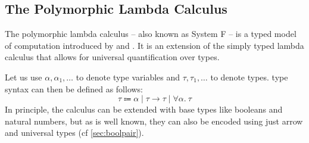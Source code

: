 \documentclass[12pt]{article}
\theoremstyle{plain}
\theoremstyle{definition}
\begin{document}
\subsection{The Polymorphic Lambda Calculus}

The polymorphic lambda calculus
-- also known as System F --
is a typed model of computation introduced by \citet{girard1972interpretation} and \citet{reynolds1974towards}.
It is an extension of the simply typed lambda calculus that allows for universal quantification over types.

Let us use $\alpha,\alpha_1,\dots$ to denote type variables and $\tau,\tau_1,\dots$ to denote types.
 type syntax can then be defined as follows:
\begin{equation*}
 \tau \Coloneqq  \alpha \mid \tau \to \tau \mid \forall \alpha.\ \tau
\end{equation*}
In principle, the calculus can be extended with base types like booleans and natural numbers,
but as is well known, they can also be encoded using just arrow and universal types (cf \cref{sec:boolpair}).
\end{document}
